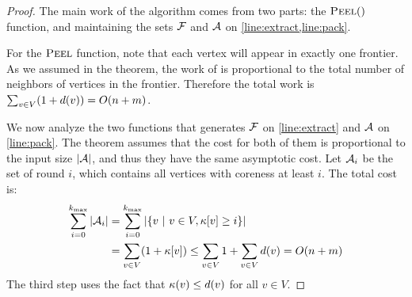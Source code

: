     \begin{proof}
        The main work of the algorithm comes from two parts: the ${\mbox{\sc{Peel}}}()$ function, and maintaining the sets ${\mathcal{F}}$ and ${\mathcal{A}}$ on 
        \cref{line:extract,line:pack}.
        
        For the ${\mbox{\sc{Peel}}}{}$ function,
        note that each vertex will appear in exactly one frontier. 
        As we assumed in the theorem, the work of \FPeel{} is proportional to the total number of neighbors of vertices in the frontier.
        Therefore the total work is $\sum_{v\in V} (1+d(v))=O(n+m)$.
        
        We now analyze the two functions that generates ${\mathcal{F}}$ on \cref{line:extract} and ${\mathcal{A}}$ on \cref{line:pack}. 
        The theorem assumes that the cost for both of them is proportional to the input size $|{\mathcal{A}}|$, and thus they have the same asymptotic cost. Let ${\mathcal{A}}_i$ be the \alive{} set of round $i$, which contains all vertices with coreness at least $i$. 
        The total cost is:
        \vspace{-.5em}
        \begin{align*}
        \sum_{i=0}^{{k_{\max}}} |{\mathcal{A}}_i| &= \sum_{i=0}^{{k_{\max}}} |\{ v~|~v\in V, {\kappa}[v]\ge i\}|\\
        &=\sum_{v\in V} (1+{\kappa}[v]) \le \sum_{v\in V} 1+\sum_{v\in V}d(v) = O(n+m)
        \end{align*}        
        \vspace{-.1em}
        The third step uses the fact that ${\kappa}(v)\le d(v)$ for all $v\in V$. 
    \end{proof}
        
